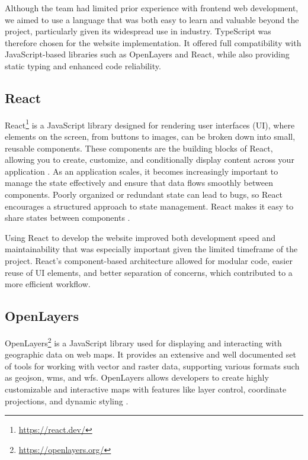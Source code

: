 Although the team had limited prior experience with frontend web development, we aimed to use a language that was both easy to learn and valuable beyond the project, particularly given its widespread use in industry. TypeScript was therefore chosen for the website implementation. It offered full compatibility with JavaScript-based libraries such as OpenLayers and React, while also providing static typing and enhanced code reliability.

\subsection{React}\label{subsec:implementation:technologies:react}

React\footnote{\url{https://react.dev/}} is a JavaScript library designed for rendering user interfaces (UI), where elements on the screen, from buttons to images, can be broken down into small, reusable components. These components are the building blocks of React, allowing you to create, customize, and conditionally display content across your application \cite{react_component}. As an application scales, it becomes increasingly important to manage the state effectively and ensure that data flows smoothly between components. Poorly organized or redundant state can lead to bugs, so React encourages a structured approach to state management. React makes it easy to share states between components \cite{react_managing_state}. 

Using React to develop the website improved both development speed and maintainability that was especially important given the limited timeframe of the project. React's component-based architecture allowed for modular code, easier reuse of UI elements, and better separation of concerns, which contributed to a more efficient workflow.

\subsection{OpenLayers}

OpenLayers\footnote{\url{https://openlayers.org/}} is a JavaScript library used for displaying and interacting with geographic data on web maps. It provides an extensive and well documented set of tools for working with vector and raster data, supporting various formats such as \Gls{geojson}, \Gls{wms}, and \Gls{wfs}. OpenLayers allows developers to create highly customizable and interactive maps with features like layer control, coordinate projections, and dynamic styling \cite{openlayers}.

